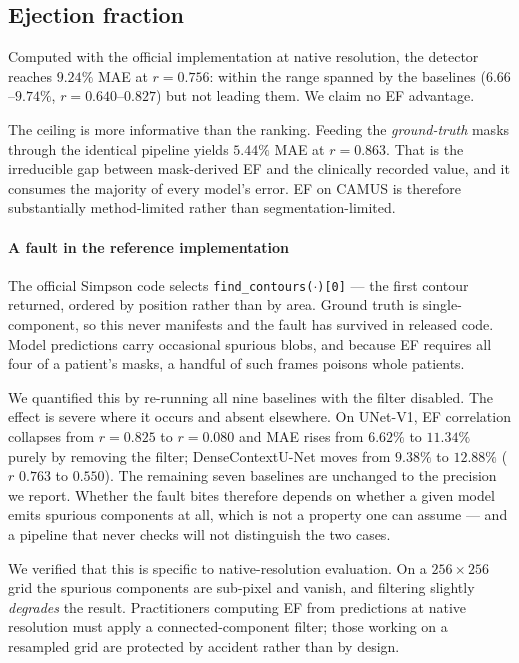 \subsection{Ejection fraction}
\label{sec:ef}



Computed with the official implementation at native resolution, the detector
reaches $9.24\%$ MAE at $r{=}0.756$: within the range spanned by the baselines
($6.66$--$9.74\%$, $r{=}0.640$--$0.827$) but not leading them. We claim no EF
advantage.

The ceiling is more informative than the ranking. Feeding the \emph{ground-truth}
masks through the identical pipeline yields $5.44\%$ MAE at $r{=}0.863$. That is
the irreducible gap between mask-derived EF and the clinically recorded value,
and it consumes the majority of every model's error. EF on CAMUS is therefore
substantially method-limited rather than segmentation-limited.

\paragraph{A fault in the reference implementation} The official Simpson code
selects \texttt{find\_contours($\cdot$)[0]} --- the first contour returned,
ordered by position rather than by area. Ground truth is single-component, so
this never manifests and the fault has survived in released code. Model
predictions carry occasional spurious blobs, and because EF requires all four of
a patient's masks, a handful of such frames poisons whole patients.

We quantified this by re-running all nine baselines with the filter disabled.
The effect is severe where it occurs and absent elsewhere. On UNet-V1, EF
correlation collapses from $r{=}0.825$ to $r{=}0.080$ and MAE rises from
$6.62\%$ to $11.34\%$ purely by removing the filter; DenseContextU-Net moves
from $9.38\%$ to $12.88\%$ ($r$ $0.763$ to $0.550$). The remaining seven
baselines are unchanged to the precision we report. Whether the fault bites
therefore depends on whether a given model emits spurious components at all,
which is not a property one can assume --- and a pipeline that never checks will
not distinguish the two cases.

We verified that this is specific to native-resolution evaluation. On a
$256\times256$ grid the spurious components are sub-pixel and vanish, and
filtering slightly \emph{degrades} the result. Practitioners computing EF from
predictions at native resolution must apply a connected-component filter; those
working on a resampled grid are protected by accident rather than by design.

